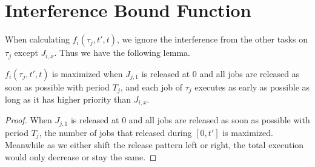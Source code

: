\section{Interference Bound Function}







When calculating $f_i(\tau_j,t',t)$, we ignore the interference from the other tasks on $\tau_j$ except $J_{i,x}$. Thus we have the following lemma.
\begin{lemma}
\label{lemma:1}
$f_i(\tau_j,t',t)$ is maximized when  $J_{j,1}$ is released at $0$ and all jobs are released as soon as possible with period $T_j$, and each job of $\tau_j$ executes as early as possible as long as it has higher priority than $J_{i,x}$.
\end{lemma}
\begin{proof}
When  $J_{j,1}$ is released at $0$ and all jobs are released as soon as possible with period $T_j$, the number of jobs that released during $[0,t']$ is maximized. Meanwhile as we either shift the release pattern left or right,  the total execution would only decrease or stay the same.
\end{proof}



